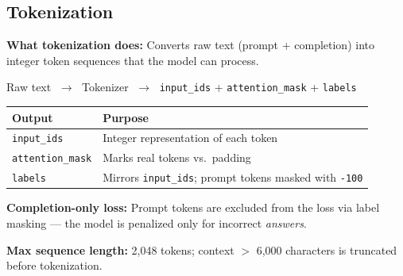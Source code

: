 \subsection{Tokenization}
\begin{frame}{\insertsubsection}
  \textbf{What tokenization does:} Converts raw text (prompt + completion) into
  integer token sequences that the model can process.

  \vspace{0.1cm}
  \begin{center}
    Raw text $\;\rightarrow\;$ Tokenizer $\;\rightarrow\;$
    \texttt{input\_ids} + \texttt{attention\_mask} + \texttt{labels}
  \end{center}

  \small
  \begin{tabular}{p{} p{}}
    \textbf{Output}           & \textbf{Purpose}                                     \\
    \hline
    \texttt{input\_ids}        & Integer representation of each token                \\
    \texttt{attention\_mask}   & Marks real tokens vs.\ padding                      \\
    \texttt{labels}            & Mirrors \texttt{input\_ids}; prompt tokens masked with \texttt{-100} \\
  \end{tabular}

  \vspace{0.1cm}
  \normalsize
  \textbf{Completion-only loss:} Prompt tokens are excluded from the loss via label
  masking --- the model is penalized only for incorrect \textit{answers}.

  \vspace{0.1cm}
  \textbf{Max sequence length:} 2,048 tokens; context $>$ 6,000 characters is
  truncated before tokenization.
\end{frame}

